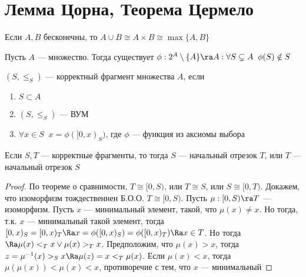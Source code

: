 
\section{Лемма Цорна, Теорема Цермело}

\begin{theorem}
    Если \(A, B\) бесконечны, то \(A \cup B \cong A \times B \cong \max \{A, B\}\)
\end{theorem}

\begin{proposition}
    Пусть \(A\) --- множество. Тогда существует \(\phi: 2^A \setminus \{A\}\ra A: \forall S \subsetneq A\;\;\phi(S) \notin S\)
\end{proposition}

\begin{definition}
    \((S, \le_S)\) --- корректный фрагмент множества \(A\), если
    \begin{enumerate}
        \item \(S \subset A\)
        \item \((S, \le_S)\) --- ВУМ
        \item \(\forall x \in S\;\; x = \phi([0, x)_S)\), где \(\phi\) --- функция из аксиомы выбора
    \end{enumerate}
\end{definition}
\begin{lemma}
    Если \(S, T\) --- корректные фрагменты, то тогда \(S\) --- начальный отрезок \(T\), или \(T\) --- начальный отрезок \(S\)
\end{lemma}
\begin{proof}
    По теореме о сравнимости, \(T \cong [0, S)\), или \(T \cong S\), или \(S \cong [0, T)\). Докажем, что изоморфизм тождественнен
    Б.О.О. \(T \cong [0, S)\). Пусть \(\mu: [0, S) \ra T\) --- изоморфизм. Пусть \(x\) --- минимальный элемент, такой, что \(\mu(x) \ne x\). Но тогда, т.к. \(x\) --- минимальный такой элемент, тогда \([0, x)_S = [0, x)_T \Ra x = \phi([0, x)_S) = \phi([0, x)_T) \Ra x \in T\). Но тогда \(\Ra \mu(x) <_T x \vee \mu(x) >_T x\). Предположим, что \(\mu(x) > x\), тогда \(z = \mu^{-1}(x) >_S x \Ra \mu(z) = x <_T \mu(x)\). Если \(\mu(x) < x\), тогда \(\mu(\mu(x)) < \mu(x) < x\), противоречие с тем, что \(x\) --- минимальный
\end{proof}

